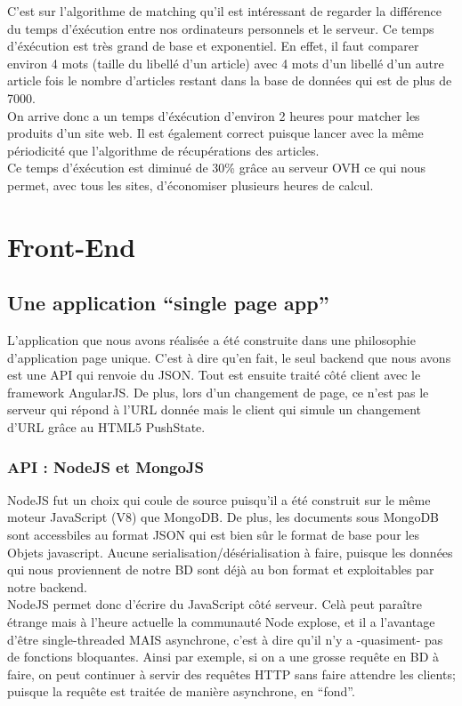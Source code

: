 \documentclass{report}
\begin{document}
C'est sur l'algorithme de matching qu'il est intéressant de regarder la différence du temps d'éxécution entre nos ordinateurs personnels et le serveur. Ce temps d'éxécution est très grand de base et exponentiel. En effet, il faut comparer environ 4 mots (taille du libellé d'un article) avec 4 mots d'un libellé d'un autre article fois le nombre d'articles restant dans la base de données qui est de plus de 7000.\\
On arrive donc a un temps d'éxécution d'environ 2 heures pour matcher les produits d'un site web. Il est également correct puisque lancer avec la même périodicité que l'algorithme de récupérations des articles.\\
Ce temps d'éxécution est diminué de 30\% grâce au serveur OVH ce qui nous permet, avec tous les sites, d'économiser plusieurs heures de calcul.

\chapter{Front-End}

\section{Une application “single page app”}
L'application que nous avons réalisée a été construite dans une philosophie d'application page unique. C'est à dire qu'en fait, le seul backend que nous avons est une API qui renvoie du JSON. Tout est ensuite traité côté client avec le framework AngularJS. De plus, lors d'un changement de page, ce n'est pas le serveur qui répond à l'URL donnée mais le client qui simule un changement d'URL grâce au HTML5 PushState.

\subsection{API : NodeJS et MongoJS}
NodeJS fut un choix qui coule de source puisqu'il a été construit sur le même moteur JavaScript (V8) que MongoDB. De plus, les documents sous MongoDB sont accessbiles au format JSON qui est bien sûr le format de base pour les Objets javascript. Aucune serialisation/désérialisation à faire, puisque les données qui nous proviennent de notre BD sont déjà au bon format et exploitables par notre backend.\\

NodeJS permet donc d'écrire du JavaScript côté serveur. Celà peut paraître étrange mais à l'heure actuelle la communauté Node explose, et il a l'avantage d'être single-threaded MAIS asynchrone, c'est à dire qu'il n'y a -quasiment- pas de fonctions bloquantes. Ainsi par exemple, si on a une grosse requête en BD à faire, on peut continuer à servir des requêtes HTTP sans faire attendre les clients; puisque la requête est traitée de manière asynchrone, en “fond”.\\\\
\end{document}
